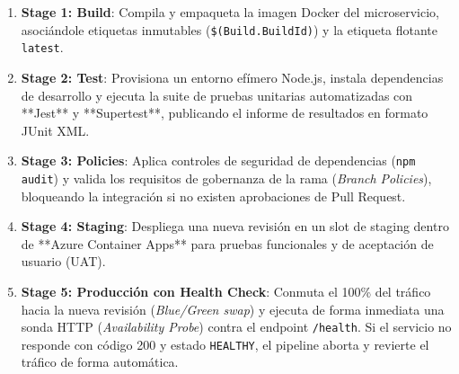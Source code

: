 \begin{enumerate}
    \item \textbf{Stage 1: Build}: Compila y empaqueta la imagen Docker del microservicio, asociándole etiquetas inmutables (\texttt{\$(Build.BuildId)}) y la etiqueta flotante \texttt{latest}.
    \item \textbf{Stage 2: Test}: Provisiona un entorno efímero Node.js, instala dependencias de desarrollo y ejecuta la suite de pruebas unitarias automatizadas con **Jest** y **Supertest**, publicando el informe de resultados en formato JUnit XML.
    \item \textbf{Stage 3: Policies}: Aplica controles de seguridad de dependencias (\texttt{npm audit}) y valida los requisitos de gobernanza de la rama (\textit{Branch Policies}), bloqueando la integración si no existen aprobaciones de Pull Request.
    \item \textbf{Stage 4: Staging}: Despliega una nueva revisión en un slot de staging dentro de **Azure Container Apps** para pruebas funcionales y de aceptación de usuario (UAT).
    \item \textbf{Stage 5: Producción con Health Check}: Conmuta el 100\% del tráfico hacia la nueva revisión (\textit{Blue/Green swap}) y ejecuta de forma inmediata una sonda HTTP (\textit{Availability Probe}) contra el endpoint \texttt{/health}. Si el servicio no responde con código 200 y estado \texttt{HEALTHY}, el pipeline aborta y revierte el tráfico de forma automática.
\end{enumerate}


